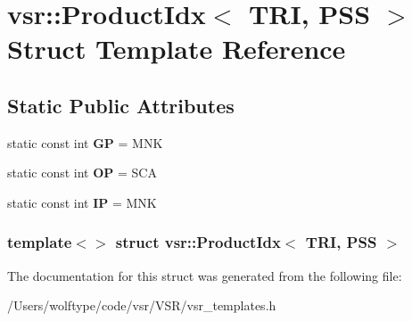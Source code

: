 \hypertarget{structvsr_1_1_product_idx_3_01_t_r_i_00_01_p_s_s_01_4}{\section{vsr\-:\-:Product\-Idx$<$ T\-R\-I, P\-S\-S $>$ Struct Template Reference}
\label{structvsr_1_1_product_idx_3_01_t_r_i_00_01_p_s_s_01_4}
}
\subsection*{Static Public Attributes}
\begin{DoxyCompactItemize}
\item 
\hypertarget{structvsr_1_1_product_idx_3_01_t_r_i_00_01_p_s_s_01_4_a2558527c654827f2165d5584ba9b67ef}{static const int {\bfseries G\-P} = M\-N\-K}\label{structvsr_1_1_product_idx_3_01_t_r_i_00_01_p_s_s_01_4_a2558527c654827f2165d5584ba9b67ef}

\item 
\hypertarget{structvsr_1_1_product_idx_3_01_t_r_i_00_01_p_s_s_01_4_af4803e8ced767aa019d68a0b3f1b0b5b}{static const int {\bfseries O\-P} = S\-C\-A}\label{structvsr_1_1_product_idx_3_01_t_r_i_00_01_p_s_s_01_4_af4803e8ced767aa019d68a0b3f1b0b5b}

\item 
\hypertarget{structvsr_1_1_product_idx_3_01_t_r_i_00_01_p_s_s_01_4_ae605f7815728f81f175c6a87927014ae}{static const int {\bfseries I\-P} = M\-N\-K}\label{structvsr_1_1_product_idx_3_01_t_r_i_00_01_p_s_s_01_4_ae605f7815728f81f175c6a87927014ae}

\end{DoxyCompactItemize}
\subsubsection*{template$<$$>$ struct vsr\-::\-Product\-Idx$<$ T\-R\-I, P\-S\-S $>$}



The documentation for this struct was generated from the following file\-:\begin{DoxyCompactItemize}
\item 
/\-Users/wolftype/code/vsr/\-V\-S\-R/vsr\-\_\-templates.\-h\end{DoxyCompactItemize}
